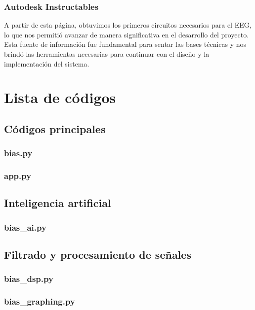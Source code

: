 \documentclass{article}
\begin{document}
\subsubsection{Autodesk Instructables}
A partir de esta página, obtuvimos los primeros circuitos necesarios para el EEG, lo que nos permitió avanzar de manera significativa en el desarrollo del proyecto. Esta fuente de información fue fundamental para sentar las bases técnicas y nos brindó las herramientas necesarias para continuar con el diseño y la implementación del sistema.


\section{Lista de códigos}

\subsection{Códigos principales}

\subsubsection{bias.py}


\subsubsection{app.py}

\subsection{Inteligencia artificial}

\subsubsection{bias\_ai.py}

\subsection{Filtrado y procesamiento de señales}

\subsubsection{bias\_dsp.py}

\subsubsection{bias\_graphing.py} 

\end{document}
